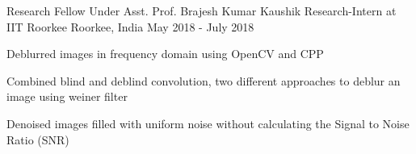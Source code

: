\begin{cventries}
  \cventry
    {Research Fellow Under Asst. Prof. Brajesh Kumar Kaushik }
    {Research-Intern at IIT Roorkee}
    {Roorkee, India}
    {May 2018 - July 2018}
    {
      \begin{cvitems}
        \item {Deblurred images in frequency domain using OpenCV and CPP}
        \item {Combined blind and deblind convolution, two different approaches to deblur an image using weiner filter }
        \item {Denoised images filled with uniform noise without calculating the Signal to Noise Ratio (SNR)}
      \end{cvitems}
    }
  
\end{cventries}
